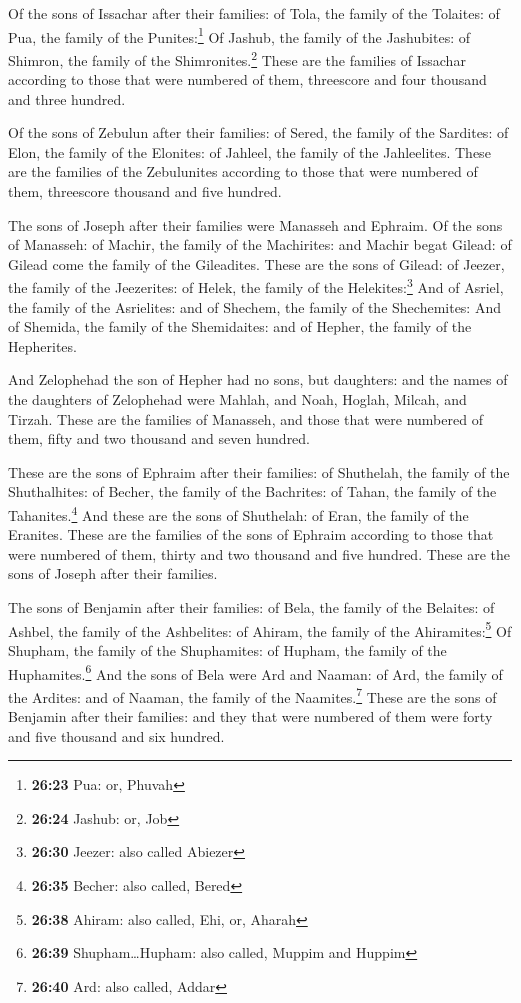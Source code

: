  Of the sons of Issachar after their families: of Tola,
the family of the Tolaites: of Pua, the family of the
Punites:\footnote{\textbf{26:23} Pua: or, Phuvah}  Of
Jashub, the family of the Jashubites: of Shimron, the family of the
Shimronites.\footnote{\textbf{26:24} Jashub: or, Job} 
These are the families of Issachar according to those that were numbered
of them, threescore and four thousand and three hundred.

 Of the sons of Zebulun after their families: of Sered,
the family of the Sardites: of Elon, the family of the Elonites: of
Jahleel, the family of the Jahleelites.  These are the
families of the Zebulunites according to those that were numbered of
them, threescore thousand and five hundred.

 The sons of Joseph after their families were Manasseh
and Ephraim.  Of the sons of Manasseh: of Machir, the
family of the Machirites: and Machir begat Gilead: of Gilead come the
family of the Gileadites.  These are the sons of Gilead:
of Jeezer, the family of the Jeezerites: of Helek, the family of the
Helekites:\footnote{\textbf{26:30} Jeezer: also called Abiezer}
 And of Asriel, the family of the Asrielites: and of
Shechem, the family of the Shechemites:  And of Shemida,
the family of the Shemidaites: and of Hepher, the family of the
Hepherites.

 And Zelophehad the son of Hepher had no sons, but
daughters: and the names of the daughters of Zelophehad were Mahlah, and
Noah, Hoglah, Milcah, and Tirzah.  These are the families
of Manasseh, and those that were numbered of them, fifty and two
thousand and seven hundred.

 These are the sons of Ephraim after their families: of
Shuthelah, the family of the Shuthalhites: of Becher, the family of the
Bachrites: of Tahan, the family of the Tahanites.\footnote{\textbf{26:35}
  Becher: also called, Bered}  And these are the sons of
Shuthelah: of Eran, the family of the Eranites.  These
are the families of the sons of Ephraim according to those that were
numbered of them, thirty and two thousand and five hundred. These are
the sons of Joseph after their families.

 The sons of Benjamin after their families: of Bela, the
family of the Belaites: of Ashbel, the family of the Ashbelites: of
Ahiram, the family of the Ahiramites:\footnote{\textbf{26:38} Ahiram:
  also called, Ehi, or, Aharah}  Of Shupham, the family
of the Shuphamites: of Hupham, the family of the Huphamites.\footnote{\textbf{26:39}
  Shupham\ldots Hupham: also called, Muppim and Huppim} 
And the sons of Bela were Ard and Naaman: of Ard, the family of the
Ardites: and of Naaman, the family of the Naamites.\footnote{\textbf{26:40}
  Ard: also called, Addar}  These are the sons of
Benjamin after their families: and they that were numbered of them were
forty and five thousand and six hundred.

